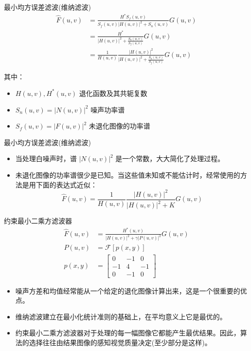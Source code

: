 \documentclass[presentation]{beamer}
\begin{document}
\begin{frame}[label={sec:orgc9eef20}]{最小均方误差滤波(维纳滤波)}
\begin{align*}
\hat F(u,v) &= \frac{H^{* } S_f(u,v)}{S_f(u,v)|H(u,v)|^2+S_n(u,v)}G(u,v) \\
&= \frac{H^{* } }{|H(u,v)|^2+\frac{S_n(u,v)}{S_f(u,v)}}G(u,v) \\
&= \frac{1}{H(u,v)}\frac{|H(u,v)|^2 }{|H(u,v)|^2+\frac{S_n(u,v)}{S_f(u,v)}}G(u,v)
\end{align*}

其中：
\begin{itemize}
\item \(H(u,v),H^{*}(u,v)\) 退化函数及其共轭复数
\item \(S_n(u,v)=|N(u,v)|^2\) 噪声功率谱
\item \(S_f(u,v)=|F(u,v)|^2\) 未退化图像的功率谱
\end{itemize}
\end{frame}

\begin{frame}[label={sec:org6b0bf9c}]{最小均方误差滤波(维纳滤波)}
\begin{itemize}
\item 当处理白噪声时，谱 \(|N(u,v)|^2\) 是一个常数，大大简化了处理过程。
\item 未退化图像的功率谱很少是已知。当这些值未知或不能估计时，经常使用的方法是用下面的表达式近似：
\[ \hat F(u,v) = \frac{1}{H(u,v)}\frac{|H(u,v)|^2 }{|H(u,v)|^2+K}G(u,v) \]
\end{itemize}
\end{frame}

\begin{frame}[label={sec:org5670fcd}]{约束最小二乘方滤波器}
\begin{align*}
\hat F(u,v) &= \frac{H^{* }(u,v) }{|H(u,v)|^2+\gamma|P(u,v)|^2}G(u,v)\\
P(u,v)&=\mathcal{F}[p(x,y)]\\
p(x,y)&=
\begin{bmatrix}
0 & -1 & 0 \\
-1 & 4 & -1 \\
0 & -1 & 0 
\end{bmatrix}
\end{align*}
\begin{itemize}
\item 噪声方差和均值经常能从一个给定的退化图像计算出来，这是一个很重要的优点。
\item 维纳滤波建立在最小化统计准则的基础上，在平均意义上它是最优的。
\item 约束最小二乘方滤波器对于处理的每一幅图像它都能产生最优结果。因此，算法的选择往往由结果图像的感知视觉质量决定(至少部分是这样)。
\end{itemize}
\end{frame}
\end{document}
